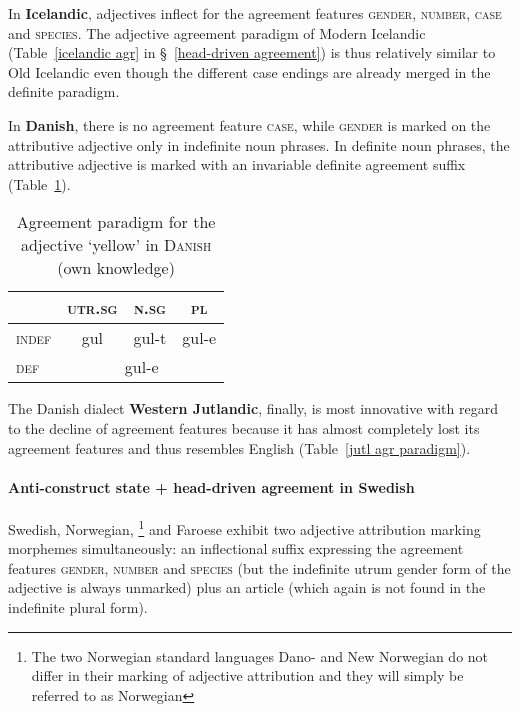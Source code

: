In {\bf Icelandic}, adjectives inflect for the agreement features \textsc{gender}, \textsc{number}, \textsc{case} and \textsc{species}. The adjective agreement paradigm of Modern Icelandic (Table~\ref{icelandic agr} in \S~\ref{head-driven agreement}) is thus relatively similar to Old Icelandic even though the different case endings are already merged in the definite paradigm.

In {\bf Danish},\label{danish synchr} there is no agreement feature \textsc{case}, while \textsc{gender} is marked on the attributive adjective only in indefinite noun phrases. In definite noun phrases, the attributive adjective is marked with an invariable definite agreement suffix (Table~\ref{danish agr paradigm}). 

\begin{table}
\begin{center}
\begin{footnotesize}
\begin{tabular}[h]{l|c c c}
\hline
\hline
		& \textsc{utr.sg}	&\textsc{n.sg}	&\textsc{pl}\\
\hline
\textsc{indef}	&gul	 	&gul-t		&gul-e\\
\hline
\textsc{def}	&\multicolumn{3}{c}{gul-e}\\
\hline
\hline
\end{tabular}
\caption[Adjective paradigm for \textsc{Danish}]{Agreement paradigm for the adjective ‘yellow’ in \textsc{Danish} (own knowledge)}\label{danish agr paradigm}
\end{footnotesize}
\end{center}
\end{table}

The Danish dialect {\bf Western Jutlandic}, finally, is most innovative with regard to the decline of agreement features because it has almost completely lost its agreement features and thus resembles English (Table~\ref{jutl agr paradigm}).

\paragraph{Anti-construct state + head-driven agreement in Swedish}\label{swedish synchr}
Swedish, Norwegian,
\footnote{The two Norwegian standard languages Dano- and New Norwegian do not differ in their marking of adjective attribution and they will simply be referred to as Norwegian}
 and Faroese exhibit two adjective attribution marking morphemes simultaneously: an inflectional suffix expressing the agreement features \textsc{gender}, \textsc{number} and \textsc{species} (but the indefinite utrum gender form of the adjective is always unmarked) plus an article (which again is not found in the indefinite plural form).

